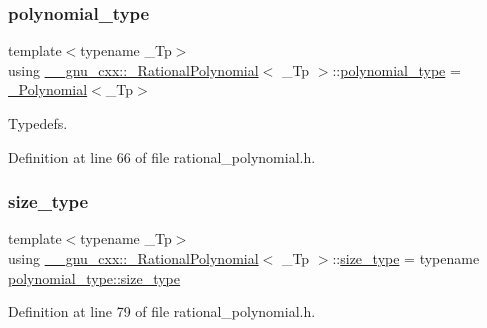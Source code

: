 \subsubsection{\texorpdfstring{polynomial\+\_\+type}{polynomial\_type}}
{\footnotesize\ttfamily template$<$typename \+\_\+\+Tp$>$ \\
using \hyperlink{class____gnu__cxx_1_1__RationalPolynomial}{\+\_\+\+\_\+gnu\+\_\+cxx\+::\+\_\+\+Rational\+Polynomial}$<$ \+\_\+\+Tp $>$\+::\hyperlink{class____gnu__cxx_1_1__RationalPolynomial_a96949c9007664fae9fef1e26cf6c2078}{polynomial\+\_\+type} =  \hyperlink{class____gnu__cxx_1_1__Polynomial}{\+\_\+\+Polynomial}$<$\+\_\+\+Tp$>$}

Typedefs. 

Definition at line 66 of file rational\+\_\+polynomial.\+h.

\mbox{\label{class____gnu__cxx_1_1__RationalPolynomial_aaba2b07e6b5f33be46c30b5d0eac6da4}} 
\subsubsection{\texorpdfstring{size\+\_\+type}{size\_type}}
{\footnotesize\ttfamily template$<$typename \+\_\+\+Tp$>$ \\
using \hyperlink{class____gnu__cxx_1_1__RationalPolynomial}{\+\_\+\+\_\+gnu\+\_\+cxx\+::\+\_\+\+Rational\+Polynomial}$<$ \+\_\+\+Tp $>$\+::\hyperlink{class____gnu__cxx_1_1__RationalPolynomial_aaba2b07e6b5f33be46c30b5d0eac6da4}{size\+\_\+type} =  typename \hyperlink{class____gnu__cxx_1_1__Polynomial_a8b25fcfd4acaad0c5c08b649c22da28a}{polynomial\+\_\+type\+::size\+\_\+type}}



Definition at line 79 of file rational\+\_\+polynomial.\+h.

\mbox{\label{class____gnu__cxx_1_1__RationalPolynomial_adeec7f1bec03111031599f337848ee8b}} 

